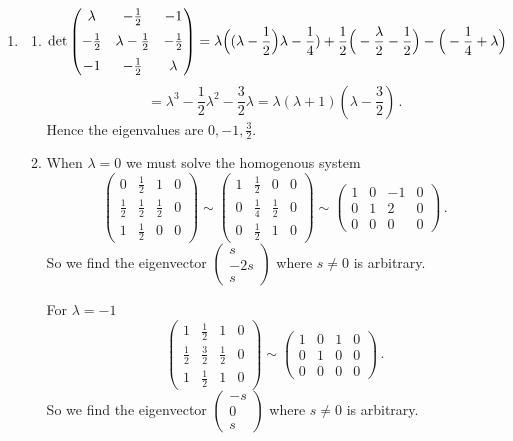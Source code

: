 \begin{enumerate}
\item 
\begin{enumerate}
\item
$$
{\rm det} \begin{pmatrix} \lambda&-\frac12 & -1 \\[2mm] -\frac12 &\lambda-\frac12 &-\frac12 \\[2mm] -1 & -\frac12 &\lambda\end{pmatrix}
=\lambda\Big((\lambda-\frac12\Big)\lambda-\frac14)+\frac12\Big(-\frac{\lambda}2-\frac12\Big)-\Big(-\frac14+\lambda\Big)
$$
$$
=\lambda^3-\frac{1}{2}\lambda^2-\frac32 \lambda=\lambda(\lambda+1)(\lambda-\frac32)\, .
$$
Hence the eigenvalues are $0,-1,\frac32$.
\item
When $\lambda=0$ we must solve the homogenous system
$$
\left(
\begin{array}{ccc|c}
0&\frac12&1&0\\[1mm]
\frac12&\frac12&\frac12&0\\[1mm]
1&\frac12&0&0
\end{array}\right)
\sim
\left(
\begin{array}{ccc|c}
1&\frac12&0&0\\[1mm]
0&\frac14&\frac12&0\\[1mm]
0&\frac12&1&0
\end{array}\right)
\sim
\left(
\begin{array}{ccc|c}
1&0&-1&0\\[1mm]
0&1&2&0\\[1mm]
0&0&0&0
\end{array}\right)\, .
$$
So we find the eigenvector $\begin{pmatrix}s\\-2s\\s\end{pmatrix}$ where $s\neq 0$ is arbitrary.

For $\lambda=-1$ 
$$
\left(
\begin{array}{ccc|c}
1&\frac12&1&0\\[1mm]
\frac12&\frac32&\frac12&0\\[1mm]
1&\frac12&1&0
\end{array}\right)
\sim
\left(
\begin{array}{ccc|c}
1&0&1&0\\[1mm]
0&1&0&0\\[1mm]
0&0&0&0
\end{array}\right)
\, .
$$
So we find the eigenvector $\begin{pmatrix}-s\\0\\s\end{pmatrix}$ where $s\neq 0$ is arbitrary.


\end{enumerate}
\end{enumerate}
